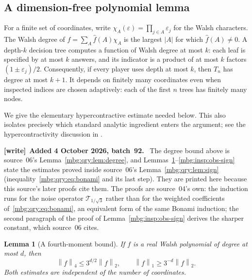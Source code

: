 \documentclass[11pt,letterpaper]{article}
\newtheorem{lemma}[theorem]{Lemma}
\theoremstyle{definition}
\newcommand{\norm}[1]{\left\lVert #1\right\rVert}
\newenvironment{writenote}[1][]{\par\smallskip\begingroup\small
 \noindent\textbf{[write]}\if\relax\detokenize{#1}\relax\else~\textbf{#1.}\fi\ }%
 {\par\endgroup\smallskip}
\begin{document}
\subsection{A dimension-free polynomial lemma}

For a finite set of coordinates, write
$\chi_A(\varepsilon)=\prod_{j\in A}\varepsilon_j$ for the Walsh characters.
The Walsh degree of $f=\sum_A\widehat f(A)\chi_A$ is the largest $|A|$
for which $\widehat f(A)\ne0$.  A depth-$k$ decision tree computes a
function of Walsh degree at most $k$: each leaf is specified by at most
$k$ answers, and its indicator is a product of at most $k$ factors
$(1\pm\varepsilon_j)/2$.  Consequently, if every player uses depth at
most $k$, then $T_n$ has degree at most $k+1$.  It depends on finitely
many coordinates even when inspected indices are chosen adaptively:
each of the first $n$ trees has finitely many nodes.

We give the elementary hypercontractive estimate needed below.  This
also isolates precisely which standard analytic ingredient enters the
argument; see the hypercontractivity discussion in
\cite{insp:AustrinHastad,insp:AustrinHastadSTOC}.

\begin{writenote}[Added 4 October 2026, batch~92]
The degree bound above is source~06's Lemma~\ref{mbg:qry:lem:degree}, and Lemmas~\ref{mbg:insp:obs-hypercontractivity}--\ref{mbg:insp:obs-sign} state the estimates proved inside source~06's Lemma~\ref{mbg:qry:lem:sign} (inequality~\eqref{mbg:qry:eq:bonami} and its last step). They are printed here because this source's later proofs cite them. The proofs are source~04's own: the induction runs for the noise operator $\mathcal T_{1/\sqrt3}$ rather than for the weighted coefficients of~\eqref{mbg:qry:eq:bonami}, an equivalent form of the same Bonami induction; the second paragraph of the proof of Lemma~\ref{mbg:insp:obs-sign} derives the sharper constant, which source~06 cites.
\end{writenote}

\begin{lemma}[A fourth-moment bound]
\label{mbg:insp:obs-hypercontractivity}
If $f$ is a real Walsh polynomial of degree at most $d$, then
\[
 \norm{f}_4\le 3^{d/2}\norm{f}_2,
 \qquad
 \norm{f}_1\ge 3^{-d}\norm{f}_2.
\]
Both estimates are independent of the number of coordinates.
\end{lemma}
\end{document}
